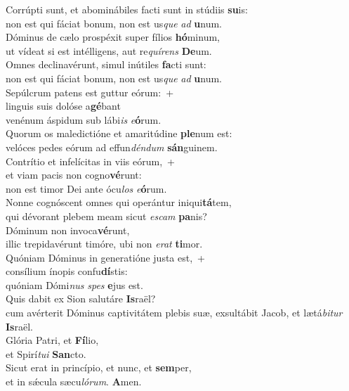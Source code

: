 \evenverse Corrúpti sunt, et abominábiles facti sunt in stúdiis \textbf{su}is:~\*\\
\evenverse non est qui fáciat bonum, non est us\textit{que} \textit{ad} \textbf{u}num.\\
\oddverse Dóminus de cælo prospéxit super fílios \textbf{hó}minum,~\*\\
\oddverse ut vídeat si est intélligens, aut re\textit{quí}\textit{rens} \textbf{De}um.\\
\evenverse Omnes declinavérunt, simul inútiles \textbf{fa}cti sunt:~\*\\
\evenverse non est qui fáciat bonum, non est us\textit{que} \textit{ad} \textbf{u}num.\\
\oddverse Sepúlcrum patens est guttur eórum:~+\\
\oddverse  linguis suis dolóse a\textbf{gé}bant~\*\\
\oddverse venénum áspidum sub lábi\textit{is} \textit{e}\textbf{ó}rum.\\
\evenverse Quorum os maledictióne et amaritúdine \textbf{ple}num est:~\*\\
\evenverse velóces pedes eórum ad effun\textit{dén}\textit{dum} \textbf{sán}guinem.\\
\oddverse Contrítio et infelícitas in viis eórum,~+\\
\oddverse  et viam pacis non cogno\textbf{vé}runt:~\*\\
\oddverse non est timor Dei ante ócu\textit{los} \textit{e}\textbf{ó}rum.\\
\evenverse Nonne cognóscent omnes qui operántur iniqui\textbf{tá}tem,~\*\\
\evenverse qui dévorant plebem meam sicut \textit{e}\textit{scam} \textbf{pa}nis?\\
\oddverse Dóminum non invoca\textbf{vé}runt,~\*\\
\oddverse illic trepidavérunt timóre, ubi non \textit{e}\textit{rat} \textbf{ti}mor.\\
\evenverse Quóniam Dóminus in generatióne justa est,~+\\
\evenverse  consílium ínopis confu\textbf{dí}stis:~\*\\
\evenverse quóniam Dómi\textit{nus} \textit{spes} \textbf{e}jus est.\\
\oddverse Quis dabit ex Sion salutáre \textbf{Is}raël?~\*\\
\oddverse cum avérterit Dóminus captivitátem plebis suæ, exsultábit Jacob, et lætá\textit{bi}\textit{tur} \textbf{Is}raël.\\
\evenverse Glória Patri, et \textbf{Fí}lio,~\*\\
\evenverse et Spirí\textit{tu}\textit{i} \textbf{San}cto.\\
\oddverse Sicut erat in princípio, et nunc, et \textbf{sem}per,~\*\\
\oddverse et in sǽcula sæcu\textit{ló}\textit{rum}. \textbf{A}men.\\
